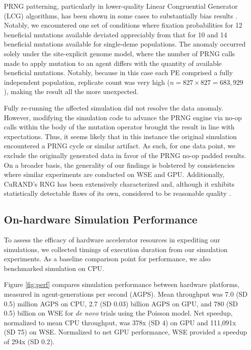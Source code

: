 PRNG patterning, particularly in lower-quality Linear Congruential Generator (LCG) algorithms, has been shown in some cases to substantially bias results \citep{click2010quality}.
Notably, we encountered one set of conditions where fixation probabilities for 12 beneficial mutations available deviated appreciably from that for 10 and 14 beneficial mutations available for single-deme populations.
The anomaly occurred solely under the site-explicit genome model, where the number of PRNG calls made to apply mutation to an agent differs with the quantity of available beneficial mutations.
Notably, because in this case each PE comprised a fully independent population, replicate count was very high ($n = 827 \times 827 = 683,929$), making the result all the more unexpected.

Fully re-running the affected simulation did not resolve the data anomaly.
However, modifying the simulation code to advance the PRNG engine via no-op calls within the body of the mutation operator brought the result in line with expectations.
Thus, it seems likely that in this instance the original simulation encountered a PRNG cycle or similar artifact.
As such, for one data point, we exclude the originally generated data in favor of the  PRNG no-op padded results.
On a broader basis, the generality of our findings is bolstered by consistencies where similar experiments are conducted on WSE and GPU.
Additionally, CuRAND's RNG has been extensively characterized and, although it exhibits statistically detectable flaws of its own, considered to be reasonable quality \citep{nvidia2024curand}.

\subsection{On-hardware Simulation Performance}
\label{sec:performance}



To assess the efficacy of hardware accelerator resources in expediting our simulations, we collected timings of execution duration from our simulation experiments.
As a baseline comparison point for performance, we also benchmarked simulation on CPU.

Figure \ref{fig:perf} compares simulation performance between hardware platforms, measured in agent-generations per second (AGPS).
Mean throughput was 7.0 (SD 0.5) million AGPS on CPU, 2.7 (SD 0.03) billion AGPS on GPU, and 780 (SD 0.5) billion on WSE for \textit{de novo} trials using the Poisson model.
Net speedup, normalized to mean CPU throughput, was 378x (SD 4) on GPU and 111,091x (SD 75) on WSE.
Normalized to net GPU performance, WSE provided a speedup of 294x (SD 0.2).

